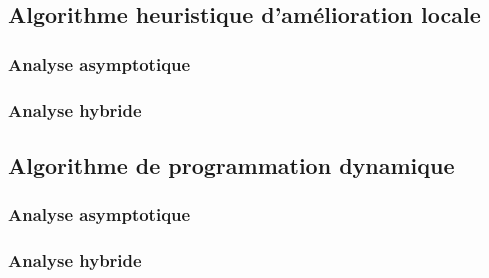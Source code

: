 \documentclass[a4paper, 12pt]{article} %
\begin{document}
\subsection*{Algorithme heuristique d'amélioration locale}
\subsubsection*{Analyse asymptotique}

\subsubsection*{Analyse hybride}
\subsection*{Algorithme de programmation dynamique}
\subsubsection*{Analyse asymptotique}
\subsubsection*{Analyse hybride}
\end{document}
